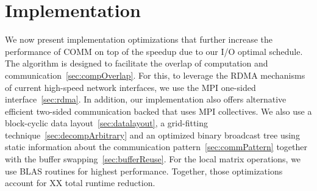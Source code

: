 \documentclass[sigplan,review,anonymous,10pt]{acmart}\settopmatter{printfolios=true,printccs=false,printacmref=false}
\begin{document}

\section{Implementation}
\label{sec:implementation}
We now present implementation optimizations that further 
increase the performance of COMM on top of the speedup due to our I/O optimal 
schedule. The algorithm is designed to facilitate the overlap of computation 
and communication~\cref{sec:compOverlap}. For this, to leverage the RDMA 
mechanisms of 
current high-speed network interfaces, we use the MPI one-sided 
interface~\cref{sec:rdma}. In addition, our implementation also offers 
alternative efficient two-sided communication backed that uses MPI collectives. 
We also use a block-cyclic data 
layout~\cref{sec:datalayout}, a grid-fitting 
technique~\cref{sec:decompArbitrary} and an optimized binary broadcast 
tree using static information about
the communication pattern~\cref{sec:commPattern} together with the buffer 
swapping~\cref{sec:bufferReuse}. For the local matrix operations, we use 
BLAS routines for highest performance. Together, those optimizations account 
for XX total runtime 
reduction. 
\end{document}

